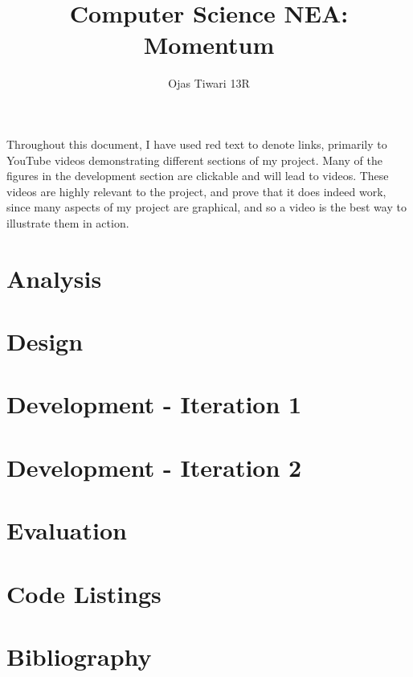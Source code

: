 \documentclass[a4paper, 12pt]{article}
\title{\textbf{Computer Science NEA: Momentum}}
\author{Ojas Tiwari 13R}
\date{}
\begin{document}


\sffamily
\maketitle
\thispagestyle{plain}

{\large Throughout this document, I have used red text to denote links, primarily to YouTube videos demonstrating different sections of my project. Many of the figures in the development section are clickable and will lead to videos. These videos are highly relevant to the project, and prove that it does indeed work, since many aspects of my project are graphical, and so a video is the best way to illustrate them in action.}

\clearpage

\tableofcontents
\clearpage

\section{Analysis}


\clearpage
\section{Design}


\clearpage
\section{Development - Iteration 1}


\clearpage
\section{Development - Iteration 2}


\clearpage
\section{Evaluation}


%

%

\section{Code Listings}



\clearpage
\section{Bibliography}
\printbibliography
\end{document}
